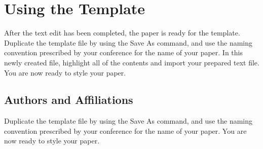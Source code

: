 \documentclass[conference,pbalance]{iaria}
\begin{document}
\section{Using the Template}
After the text edit has been completed, the paper is ready for the template. Duplicate the template file by using the Save As command, and use the naming convention prescribed by your conference for the name of your paper. In this newly created file, highlight all of the contents and import your prepared text file. You are now ready to style your paper.

\subsection{Authors and Affiliations}
Duplicate the template file by using the Save As command, and use the naming convention prescribed by your conference for the name of your paper. You are now ready to style your paper.

\end{document}
